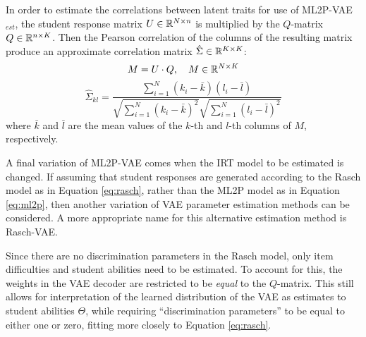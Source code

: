 In order to estimate the correlations between latent traits for use of ML2P-VAE$_{est}$, the student response matrix $U \in \mathbb{R}^{N\times n}$ is multiplied by the $Q$-matrix $Q \in \mathbb{R}^{n \times K}$. Then the Pearson correlation of the columns of the resulting matrix produce an approximate correlation matrix $\hat \Sigma \in \mathbb{R}^{K \times K}$: 
\[M = U \cdot Q , \quad M \in \mathbb{R}^{N\times K}\]
\begin{equation}
  \hat \Sigma_{kl} = \frac{\sum_{i=1}^N (k_i - \bar k)(l_i - \bar l)}{\sqrt{\sum_{i=1}^N(k_i - \bar k)^2} \sqrt{\sum_{i=1}^N (l_i - \bar l)^2}}
  \label{eq:approx_cor_mat}
\end{equation}
where $\bar k$ and $\bar l$ are the mean values of the $k$-th and $l$-th columns of $M$, respectively.

A final variation of ML2P-VAE comes when the IRT model to be estimated is changed. If assuming that student responses are generated according to the Rasch model as in Equation \ref{eq:rasch}, rather than the ML2P model as in Equation \ref{eq:ml2p}, then another variation of VAE parameter estimation methods can be considered. A more appropriate name for this alternative estimation method is Rasch-VAE.

Since there are no discrimination parameters in the Rasch model, only item difficulties and student abilities need to be estimated. To account for this, the weights in the VAE decoder are restricted to be \textit{equal} to the $Q$-matrix. This still allows for interpretation of the learned distribution of the VAE as estimates to student abilities $\Theta$, while requiring ``discrimination parameters'' to be equal to either one or zero, fitting more closely to Equation \ref{eq:rasch}.

